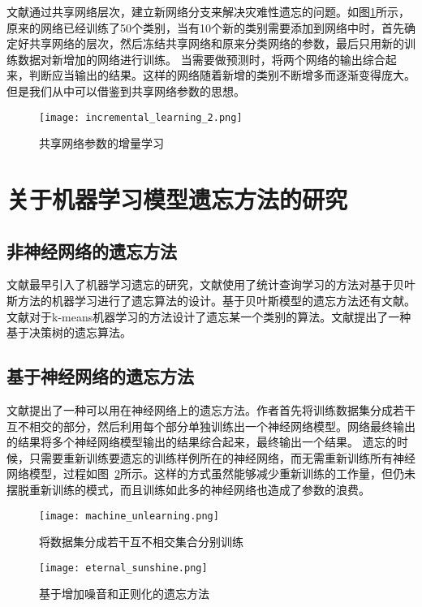 文献\cite{Sarwar_2020}通过共享网络层次，建立新网络分支来解决灾难性遗忘的问题。如图\ref{fig:incremental_learning_2}所示，原来的网络已经训练了50个类别，当有10个新的类别需要添加到网络中时，首先确定好共享网络的层次，然后冻结共享网络和原来分类网络的参数，最后只用新的训练数据对新增加的网络进行训练。
当需要做预测时，将两个网络的输出综合起来，判断应当输出的结果。这样的网络随着新增的类别不断增多而逐渐变得庞大。但是我们从中可以借鉴到共享网络参数的思想。
\begin{figure}
    \centering
    \texttt{[image: incremental\_learning\_2.png]}
    \caption{共享网络参数的增量学习\cite{Sarwar_2020}}
    \label{fig:incremental_learning_2}
\end{figure}

\section{关于机器学习模型遗忘方法的研究}
\subsection{非神经网络的遗忘方法}
文献\cite{yinzhicao2015}最早引入了机器学习遗忘的研究，文献使用了统计查询学习\cite{10.1145/293347.293351}的方法对基于贝叶斯方法的机器学习进行了遗忘算法的设计。基于贝叶斯模型的遗忘方法还有文献\cite{10.1145/3196494.3196517}。
文献\cite{antonio2019}对于k-means机器学习的方法设计了遗忘某一个类别的算法。文献\cite{10.1007/978-3-319-40159-1_19}提出了一种基于决策树的遗忘算法。

\subsection{基于神经网络的遗忘方法}
文献\cite{2019arXiv191203817B}提出了一种可以用在神经网络上的遗忘方法。作者首先将训练数据集分成若干互不相交的部分，然后利用每个部分单独训练出一个神经网络模型。网络最终输出的结果将多个神经网络模型输出的结果综合起来，最终输出一个结果。
遗忘的时候，只需要重新训练要遗忘的训练样例所在的神经网络，而无需重新训练所有神经网络模型，过程如图~\ref{fig:machine_unlearning}所示。这样的方式虽然能够减少重新训练的工作量，但仍未摆脱重新训练的模式，而且训练如此多的神经网络也造成了参数的浪费。
\begin{figure}
    \centering
    \texttt{[image: machine\_unlearning.png]}
    \caption{将数据集分成若干互不相交集合分别训练\cite{2019arXiv191203817B}}
    \label{fig:machine_unlearning}
\end{figure}
\begin{figure}
    \centering
    \texttt{[image: eternal\_sunshine.png]}
    \caption{基于增加噪音和正则化的遗忘方法\cite{2019arXiv191203817B}}
    \label{fig:eternal_sunshine}
\end{figure}

